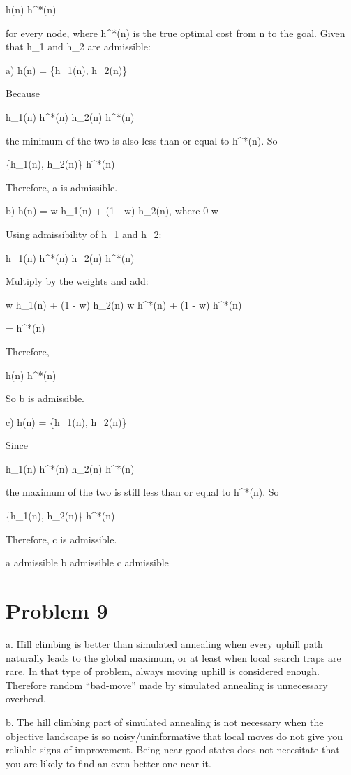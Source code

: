 \documentclass{article}
\begin{document}
h(n) \le h^*(n)

for every node, where h^*(n) is the true optimal cost from n to the goal. Given that h_1 and h_2 are admissible:

a) h(n) = \min\{h_1(n), h_2(n)\}

Because

h_1(n) \le h^*(n)  
h_2(n) \le h^*(n)

the minimum of the two is also less than or equal to h^*(n). So

\min\{h_1(n), h_2(n)\} \le h^*(n)

Therefore, a is admissible.

b) h(n) = w h_1(n) + (1 - w) h_2(n), where 0 \le w 

Using admissibility of h_1 and h_2:

h_1(n) \le h^*(n)  
h_2(n) \le h^*(n)

Multiply by the weights and add:

w h_1(n) + (1 - w) h_2(n)
\le w h^*(n) + (1 - w) h^*(n)

= h^*(n)

Therefore,

h(n) \le h^*(n)

So b is admissible.

c) h(n) = \max\{h_1(n), h_2(n)\}

Since

h_1(n) \le h^*(n)  
h_2(n) \le h^*(n)

the maximum of the two is still less than or equal to h^*(n). So

\max\{h_1(n), h_2(n)\} \le h^*(n)

Therefore, c is admissible.

a admissible  
b admissible  
c admissible

\section*{Problem 9}
a. Hill climbing is better than simulated annealing when every uphill path naturally leads to the global maximum, or at least when local search traps are rare. In that type of problem, always moving uphill is considered enough. Therefore random “bad-move” made by simulated annealing is unnecessary overhead.

b. The hill climbing part of simulated annealing is not necessary when the objective landscape is so noisy/uninformative that local moves do not give you reliable signs of improvement. Being near good states does not necesitate that you are likely to find an even better one near it.
\end{document}
